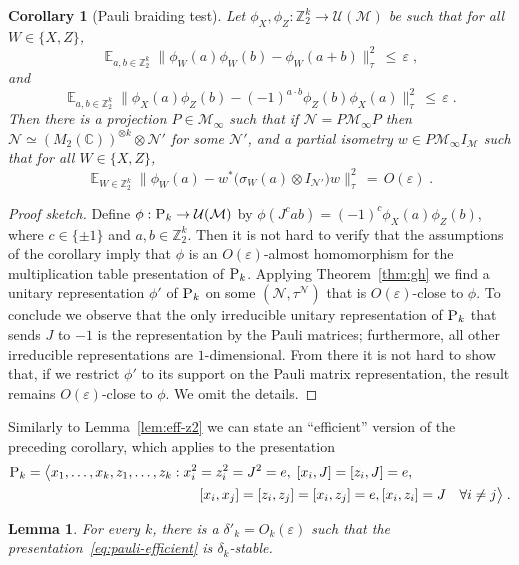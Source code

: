 \documentclass[11pt]{article}
\newtheorem{lemma}[theorem]{Lemma}
\newtheorem{corollary}[theorem]{Corollary}
\theoremstyle{definition}
\newcommand{\Id}{\ensuremath{I}}
\DeclareMathOperator*{\Expectation}{\mathbb{E}}
\newcommand{\Es}[1]{\Expectation_{#1}}
\newcommand{\C}{\ensuremath{\mathbb{C}}}
\newcommand{\Z}{\ensuremath{\mathbb{Z}}}
\newcommand{\mM}{\ensuremath{\mathcal{M}}}
\newcommand{\mU}{\ensuremath{\mathcal{U}}}
\newcommand{\eps}{\varepsilon}
\newcommand{\mN}{\mathcal{N}}
\newcommand{\gamestyle}[1]{\ensuremath{\textsc{#1}}\xspace}
\newcommand{\pauli}{\gamestyle{P}}
\begin{document}
\begin{corollary}[Pauli braiding test]
Let $\phi_X,\phi_Z:\Z_2^k \to \mU(\mM)$ be such that for all $W\in \{X,Z\}$,
\[ \Es{a,b\in \Z_2^k} \big\| \phi_W(a)\phi_W(b)-\phi_W(a+b) \big\|_\tau^2 \,\leq\,\eps\;,\]
and
\[ \Es{a,b\in \Z_2^k} \big\| \phi_X(a)\phi_Z(b)- (-1)^{a\cdot b} \phi_Z(b)\phi_X(a) \big\|_{\tau}^2 \,\leq\,\eps\;.\]
Then there is a projection $P\in \mM_\infty$ such that if $\mN=P\mM_\infty P$ then $\mN\simeq (M_2(\C))^{\otimes k} \otimes \mN'$ for some $\mN'$, and a
partial isometry $w\in P\mM_\infty I_\mM$ such that for all $W\in \{X,Z\}$, 
\[ \Es{W\in \Z_2^k} \big\| \phi_W(a) - w^* \big(\sigma_W(a)\otimes \Id_{\mN'}\big) w \big\|_{\tau}^2 \,=\, O(\eps)\;.\]
\end{corollary}

\begin{proof}[Proof sketch]
Define $\phi:\pauli_k \to \mU(\mM)$ by $\phi(J^c ab)= (-1)^c \phi_X(a)\phi_Z(b)$, where $c\in \{\pm 1\}$ and $a,b\in \Z_2^k$. Then it is not hard to verify that the assumptions of the corollary imply that  $\phi$ is an $O(\eps)$-almost homomorphism for the multiplication table presentation of $\pauli_k$. Applying Theorem~\ref{thm:gh} we find a unitary representation $\phi'$ of $\pauli_k$ on some $(\mN,\tau^\mN)$ that is $O(\eps)$-close to $\phi$. To conclude we observe that the only irreducible unitary representation of $\pauli_k$ that sends $J$ to $-1$ is the representation by the Pauli matrices; furthermore, all other irreducible representations are $1$-dimensional. From there it is not hard to show that, if we restrict $\phi'$ to its support on the Pauli matrix representation, the result remains $O(\eps)$-close to $\phi$. We omit the details. 
\end{proof}

Similarly to Lemma~\ref{lem:eff-z2} we can state an ``efficient'' version of the preceding corollary, which applies to the presentation
\begin{align}
 \pauli_k = \big\langle x_1,\ldots,x_k,z_1,\ldots,z_k &: x_i^2=z_i^2=J^2=e,\; [x_i,J]=[z_i,J]=e,\notag\\
&\qquad  [x_i,x_j]=[z_i,z_j]=[x_i,z_j]=e, [x_i,z_i]=J \quad \forall i\neq j \big\rangle\;.\label{eq:pauli-efficient}
\end{align}

\begin{lemma}\label{lem:eff-pauli}
For every $k$, there is a $\delta'_k = O_k(\eps)$ such that the presentation~\eqref{eq:pauli-efficient} is $\delta_k$-stable. 
\end{lemma}
\end{document}
